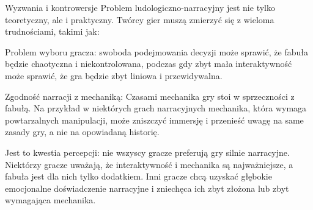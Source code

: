 \begin{frame}{Wyzwania i kontrowersje}
Problem ludologiczno-narracyjny jest nie tylko teoretyczny, ale i praktyczny. Twórcy gier muszą zmierzyć się z wieloma trudnościami, takimi jak:

Problem wyboru gracza: swoboda podejmowania decyzji może sprawić, że fabuła będzie chaotyczna i niekontrolowana, podczas gdy zbyt mała interaktywność może sprawić, że gra będzie zbyt liniowa i przewidywalna.

Zgodność narracji z mechaniką: Czasami mechanika gry stoi w sprzeczności z fabułą. Na przykład w niektórych grach narracyjnych mechanika, która wymaga powtarzalnych manipulacji, może zniszczyć immersję i przenieść uwagę na same zasady gry, a nie na opowiadaną historię.

Jest to kwestia percepcji: nie wszyscy gracze preferują gry silnie narracyjne. Niektórzy gracze uważają, że interaktywność i mechanika są najważniejsze, a fabuła jest dla nich tylko dodatkiem. Inni gracze chcą uzyskać głębokie emocjonalne doświadczenie narracyjne i zniechęca ich zbyt złożona lub zbyt wymagająca mechanika.
\end{frame}

